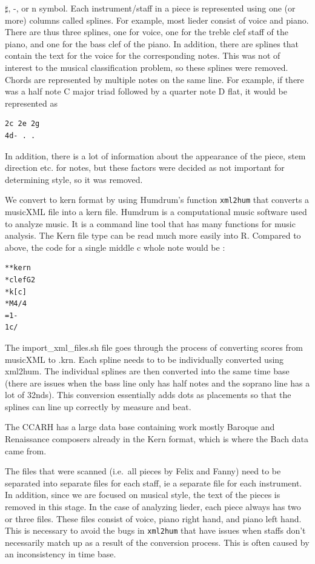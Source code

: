 \documentclass[12pt,twoside]{reedthesis}
\theoremstyle{definition}
\theoremstyle{definition}
\theoremstyle{definition}
\theoremstyle{remark}
\begin{document}
\(\sharp\), -, or n symbol. Each instrument/staff in a piece is
represented using one (or more) columns called splines. For example,
most lieder consist of voice and piano. There are thus three splines,
one for voice, one for the treble clef staff of the piano, and one for
the bass clef of the piano. In addition, there are splines that contain
the text for the voice for the corresponding notes. This was not of
interest to the musical classification problem, so these splines were
removed. Chords are represented by multiple notes on the same line. For
example, if there was a half note C major triad followed by a quarter
note D flat, it would be represented as
\begin{verbatim}
2c 2e 2g
4d- . . 
\end{verbatim}
In addition, there is a lot of information about the appearance of the
piece, stem direction etc. for notes, but these factors were decided as
not important for determining style, so it was removed.

We convert to kern format by using Humdrum's function \texttt{xml2hum}
that converts a musicXML file into a kern file. Humdrum is a
computational music software used to analyze music. It is a command line
tool that has many functions for music analysis. The Kern file type can
be read much more easily into R. Compared to above, the code for a
single middle c whole note would be :
\begin{verbatim}
**kern
*clefG2
*k[c]
*M4/4
=1-
1c/
\end{verbatim}
The import\_xml\_files.sh file goes through the process of converting
scores from musicXML to .krn. Each spline needs to to be individually
converted using xml2hum. The individual splines are then converted into
the same time base (there are issues when the bass line only has half
notes and the soprano line has a lot of 32nds). This conversion
essentially adds dots as placements so that the splines can line up
correctly by measure and beat.

The CCARH has a large data base containing work mostly Baroque and
Renaissance composers already in the Kern format, which is where the
Bach data came from.

The files that were scanned (i.e.~all pieces by Felix and Fanny) need to
be separated into separate files for each staff, ie a separate file for
each instrument. In addition, since we are focused on musical style, the
text of the pieces is removed in this stage. In the case of analyzing
lieder, each piece always has two or three files. These files consist of
voice, piano right hand, and piano left hand. This is necessary to avoid
the bugs in \texttt{xml2hum} that have issues when staffs don't
necessarily match up as a result of the conversion process. This is
often caused by an inconsistency in time base.
\end{document}
